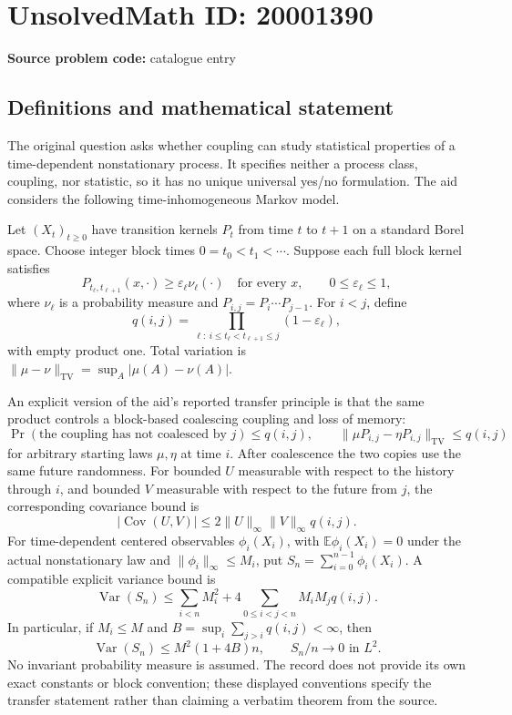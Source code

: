 \documentclass[11pt]{article}
\newcommand{\E}{\mathbb{E}}
\begin{document}
\section*{UnsolvedMath ID: 20001390}
\textbf{Source problem code:} catalogue entry
\subsection{Definitions and mathematical statement}
The original question asks whether coupling can study statistical properties of a time-dependent nonstationary process. It specifies neither a process class, coupling, nor statistic, so it has no unique universal yes/no formulation. The aid considers the following time-inhomogeneous Markov model.

Let \((X_t)_{t\geq0}\) have transition kernels \(P_t\) from time \(t\) to \(t+1\) on a standard Borel space. Choose integer block times \(0=t_0<t_1<\cdots\). Suppose each full block kernel satisfies
\[
 P_{t_\ell,t_{\ell+1}}(x,\cdot)\geq\varepsilon_\ell\nu_\ell(\cdot)
 \quad\text{for every }x,\qquad0\leq\varepsilon_\ell\leq1,
\]
where \(\nu_\ell\) is a probability measure and \(P_{i,j}=P_i\cdots P_{j-1}\). For \(i<j\), define
\[
 q(i,j)=\prod_{\ell:\ i\leq t_\ell<t_{\ell+1}\leq j}(1-\varepsilon_\ell),
\]
with empty product one. Total variation is \(\|\mu-\nu\|_{\mathrm{TV}}=\sup_A|\mu(A)-\nu(A)|\).

An explicit version of the aid's reported transfer principle is that the same product controls a block-based coalescing coupling and loss of memory:
\[
 \Pr(\text{the coupling has not coalesced by }j)\leq q(i,j),\qquad
 \|\mu P_{i,j}-\eta P_{i,j}\|_{\mathrm{TV}}\leq q(i,j)
\]
for arbitrary starting laws \(\mu,\eta\) at time \(i\). After coalescence the two copies use the same future randomness. For bounded \(U\) measurable with respect to the history through \(i\), and bounded \(V\) measurable with respect to the future from \(j\), the corresponding covariance bound is
\[
 |\operatorname{Cov}(U,V)|\leq2\|U\|_\infty\|V\|_\infty q(i,j).
\]
For time-dependent centered observables \(\phi_i(X_i)\), with \(\E\phi_i(X_i)=0\) under the actual nonstationary law and \(\|\phi_i\|_\infty\leq M_i\), put \(S_n=\sum_{i=0}^{n-1}\phi_i(X_i)\). A compatible explicit variance bound is
\[
 \operatorname{Var}(S_n)\leq\sum_{i<n}M_i^2+
 4\sum_{0\leq i<j<n}M_iM_jq(i,j).
\]
In particular, if \(M_i\leq M\) and \(B=\sup_i\sum_{j>i}q(i,j)<\infty\), then
\[
 \operatorname{Var}(S_n)\leq M^2(1+4B)n,\qquad S_n/n\longrightarrow0\text{ in }L^2.
\]
No invariant probability measure is assumed. The record does not provide its own exact constants or block convention; these displayed conventions specify the transfer statement rather than claiming a verbatim theorem from the source.
\end{document}

